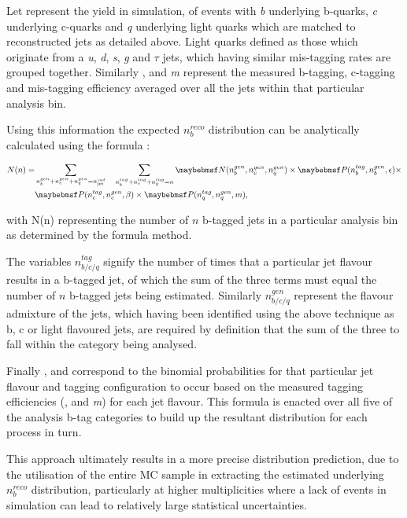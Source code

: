  Let \nbcq represent the yield in simulation, of events with \textit{b} underlying b-quarks, \textit{c} underlying c-quarks and \textit{q} underlying light quarks which are matched to reconstructed jets as detailed above. Light quarks defined as those which originate from a \textit{u}, \textit{d}, \textit{s}, \textit{g} and $\tau$ jets, which having similar mis-tagging rates are grouped together.  Similarly \eff, \ceff and \textit{m} represent the measured b-tagging, c-tagging and mis-tagging efficiency averaged over all the jets within that particular analysis bin. 
 
 Using this information the expected $n_{b}^{reco}$ distribution can be analytically calculated using the formula :

\begin{align}
\label{eq:btagformula}
N(n) =& \sum_{n_{b}^{gen}+n_{c}^{gen}+n_{q}^{gen} = n_{\text{jet}}^{cat}} \quad \sum_{n_{b}^{tag}+n_{c}^{tag}+n_{q}^{tag} = n} \nbcq \times \probb \times \nonumber \\
& \probc \times \probl,
\end{align}

with N(n) representing the number of $n$ b-tagged jets in a particular analysis bin as determined by the formula method. 

The variables $n_{b/c/q}^{tag}$ signify the number of times that a particular jet flavour results in a b-tagged jet, of which the sum of the three terms must equal the number of $n$ b-tagged jets being estimated. Similarly $n_{b/c/q}^{gen}$ represent the flavour admixture of the jets, which having been identified using the above technique as b, c or light flavoured jets, are required by definition that the sum of the three to fall within the \njet category being analysed. 

Finally \probb, \probc and \probl correspond to the binomial probabilities for that particular jet flavour and tagging configuration to occur based on the measured tagging efficiencies (\eff, \ceff and \textit{m}) for each jet flavour. This formula is enacted over all five of the analysis b-tag categories to build up the resultant \nbreco distribution for each process in turn.

This approach ultimately results in a more precise \nbreco distribution prediction, due to the utilisation of the entire MC sample in extracting the estimated underlying $n_{b}^{reco}$ distribution, particularly at higher \nbreco multiplicities where a lack of events in simulation can lead to relatively large statistical uncertainties.


